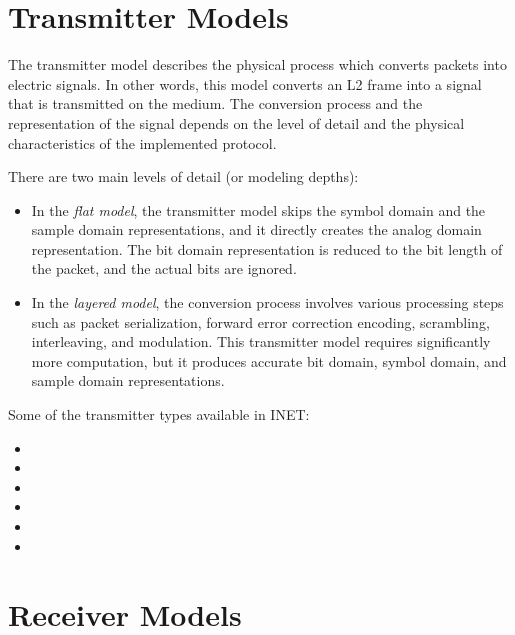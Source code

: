 \section{Transmitter Models}

The transmitter model describes the physical process which converts packets into
electric signals. In other words, this model converts an L2 frame into a signal
that is transmitted on the medium. The conversion process and the representation
of the signal depends on the level of detail and the physical characteristics
of the implemented protocol.

There are two main levels of detail (or modeling depths):
 
\begin{itemize}
\item In the \textit{flat model}, the transmitter model skips the symbol domain 
and the sample domain representations, and it directly creates the analog domain 
representation. The bit domain representation is reduced to the bit length of 
the packet, and the actual bits are ignored.

\item In the \textit{layered model}, the conversion process involves various 
processing steps such as packet serialization, forward error correction encoding, 
scrambling, interleaving, and modulation. This transmitter model requires 
significantly more computation, but it produces accurate bit domain, 
symbol domain, and sample domain representations.
\end{itemize}

Some of the transmitter types available in INET:

\begin{itemize}
  \item {}
  \item {}
  \item {}
  \item {}
  \item {}
  \item {}
\end{itemize}


\section{Receiver Models}

